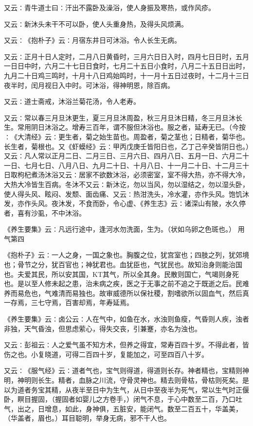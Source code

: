 \documentclass[a4paper,12pt,UTF8,twoside]{ctexbook}
\begin{document}
又云∶青牛道士曰∶汗出不露卧及澡浴，使人身振及寒热，或作风疹。

又云∶新沐头未干不可以卧，使人头重身热，及得头风烦满。

又云∶《抱朴子》云∶月宿东井日可沐浴。令人长生无病。

又云∶正月十日人定时，二月八日黄昏时，三月六日日入时，四月七日日时，五月一日日中时，六月二十七日日食时，七月二十五日小食时，八月二十五日日出时，九月二十日鸡三鸣时，十月十八日鸡始鸣时，十一月十五日过夜时，十二月十三日夜半时，闰月视日入中时。可沐浴，得神明恩，除百病。

又云∶道士斋戒，沐浴兰菊花汤，令人老寿。

又云∶常以春三月旦沐更生，夏三月旦沐周盈，秋三月旦沐日精，冬三月旦沐长生。常用阴日沐浴之。增寿三百年，谓不服但沐浴也。服之者，延寿无已。（今按∶《大清经》云∶更生者，菊之始生苗也。周盈者，菊之茎也；日精者，菊华也。长生者，菊根也。又《虾蟆经》云∶甲丙戊庚壬皆阳日也，乙丁己辛癸皆阴日也。）又云∶凡人常以正月二日、二月三日、三月六日、四月八日、五月一日、六月二十一日、七月七日、八月八日、九月二十日、十月八日、十一月二十日、十二月三十日取枸杞煮汤沐浴又云∶居家不欲数沐浴，必须密室，室不得大热，亦不得大冷，大热大冷皆生百病。冬沐不又云∶新沐讫，勿以当风，勿以湿结之，勿以湿头卧，使人得头风、眩闷、发颓、面齿痛、又云∶热泔洗头，冷水灌，亦作头风。饱饥沐发，亦作头风。夜沐发，不食而卧，令心虚、《养生志》云∶诸深山有陂，水久停者，喜有沙虱，不中沐浴。

《养生要集》云∶凡远行途中，逢河水勿洗面，生为。（状如乌卵之色斑也。）
用气第四

《抱朴子》云∶一人之身，一国之象也。胸腹之位，犹宫室也；四肢之列，犹郊境也；骨节之分，犹百官也；神犹君也。血犹臣也，气犹民也。故知治身则能治国也。夫爱其民，所以安其国，KT其气，所以全其身。民散则国亡，气竭则身死也。是以至人修未起之患，治未病之疾，医之于无事之前不追之于既逝之后。民难养而易危也，气难清而易独也。故审威德所以保社稷，割嗜欲所以固血气，然后真一存焉，三七守焉，百害却焉，年寿延焉。

《养生要集》云∶卤公云∶人在气中，如鱼在水，水浊则鱼瘦，气昏则人疾，浊者非独，天气昏浊，但思虑萦心，得失交丧，引兼蹇，亦名为浊也。

又云∶彭祖云∶人之爱气虽不知方术，但养之得宜，常寿百四十岁。不得此者，皆伤之也。小复晓道，可得二百四十岁，复能加之，可至四百八十岁。

又云∶《服气经》云∶道者气也，宝气则得道，得道则长存。神者精也，宝精则神明，神明则长生。精者，血脉之川流，守骨灵神也。精去则骨枯，骨枯则死矣。是以为道者务宝其精，从夜半至日中为生气，从日中至夜半为死气，常以生气时正偃卧，瞑目握固，（握固者如婴儿之方卷手，）闭气不息，于心中数至二百，乃口吐气，出之，日增息，如此，身神俱，五脏安，能闭气。数至二百五十，华盖美，（华盖者，眉也。）耳目聪明，举身无病，邪不干人也。
\end{document}
